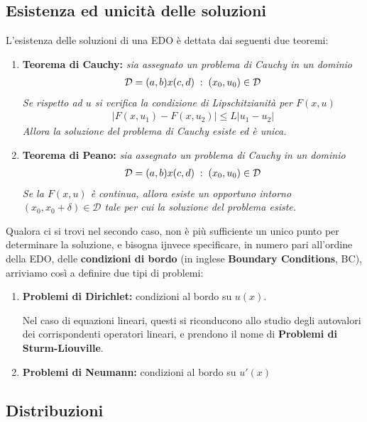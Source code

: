 \subsection{Esistenza ed unicità delle soluzioni}

L'esistenza delle soluzioni di una EDO è dettata dai seguenti due teoremi:
\begin{enumerate}
	\item \textbf{Teorema di Cauchy:} \textit{sia assegnato un problema di Cauchy in un dominio
		\begin{align}
			\mathcal{D} = (a,b)x(c,d) \; : \; (x_0,u_0) \in \mathcal{D}
		\end{align}
		Se rispetto ad $u$ si verifica la condizione di Lipschitzianità per $F(x,u)$
		\begin{align}
			|F(x,u_1) - F(x,u_2)| \leq L|u_1 - u_2|
		\end{align}
		Allora la soluzione del problema di Cauchy esiste ed è unica.	
	}
	\item \textbf{Teorema di Peano:} \textit{sia assegnato un problema di Cauchy in un dominio
		\begin{align}
			\mathcal{D} = (a,b)x(c,d) \; : \; (x_0,u_0) \in \mathcal{D}
		\end{align}
		Se la $F(x,u)$ è continua, allora esiste un opportuno intorno $(x_0, x_0+\delta) \in \mathcal{D}$ tale per cui la soluzione del problema esiste.
	}
\end{enumerate}

Qualora ci si trovi nel secondo caso, non è più sufficiente un unico punto per determinare la soluzione, e bisogna ijnvece specificare, in numero pari all'ordine della EDO, delle \textbf{condizioni di bordo} (in inglese \textbf{Boundary Conditions}, BC), arriviamo così a definire due tipi di problemi:
\begin{enumerate}
	\item \textbf{Problemi di Dirichlet:} condizioni al bordo su $u(x)$. 
	
	Nel caso di equazioni lineari, questi si riconducono allo studio degli autovalori dei corrispondenti operatori lineari, e prendono il nome di \textbf{Problemi di Sturm-Liouville}.
	\item \textbf{Problemi di Neumann:} condizioni al bordo su $u'(x)$
\end{enumerate}

\subsection{Distribuzioni}

